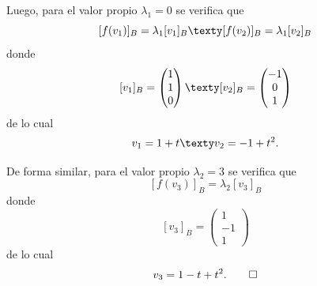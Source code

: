 \documentclass[10pt,a4]{examenEPN}
\begin{document}
\begin{preguntas}
\begin{respuesta}
\begin{enumerate}
    Luego, para el valor propio $\lambda_{1} = 0$ se verifica que 
    \[
        [f(v_{1})]_{B} = \lambda_{1}[v_{1}]_{B}
        \texty
        [f(v_{2})]_{B} = \lambda_{1}[v_{2}]_{B}
    \]
    donde
    \[
        [v_{1}]_{B} = \begin{pmatrix}1\\1\\0\end{pmatrix}
        \texty
        [v_{2}]_{B} = \begin{pmatrix}-1\\0\\1\end{pmatrix}
    \]
    de lo cual
    \[
        v_{1} = 1 + t
        \texty
        v_{2} = -1 +  t^{2}.
    \]
    
    De forma similar, para el valor propio $\lambda_{2} = 3$ se verifica que 
    \[
        [f(v_{3})]_{B} = \lambda_{2}[v_{3}]_{B}
    \]
    donde
    \[
        [v_{3}]_{B} = \begin{pmatrix}1\\-1\\1\end{pmatrix}
    \]
    de lo cual
    \[
        v_{3} = 1 - t +  t^{2}.\qedhere
    \]
\end{enumerate}
\end{respuesta}

\end{preguntas}
\end{document}
